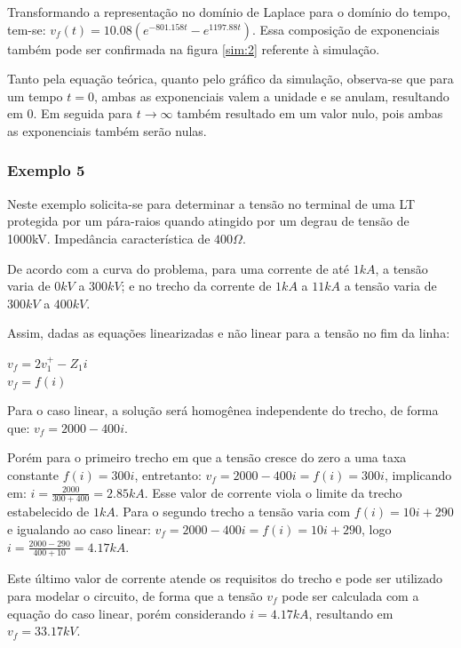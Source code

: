 Transformando a representação no domínio de Laplace para o domínio do tempo, tem-se: $v_f(t) = 10.08(e^{-801.158t}-e^{1197.88t})$. Essa composição de exponenciais também pode ser confirmada na figura \ref{sim:2} referente à simulação.

Tanto pela equação teórica, quanto pelo gráfico da simulação, observa-se que para um tempo $t=0$, ambas as exponenciais valem a unidade e se anulam, resultando em 0. Em seguida para $t\longrightarrow \infty$ também resultado em um valor nulo, pois ambas as exponenciais também serão nulas.


\subsubsection*{Exemplo 5}

Neste exemplo solicita-se para determinar a tensão no terminal de uma LT protegida por um pára-raios quando atingido por um degrau de tensão de 1000kV. Impedância característica de $400 \Omega$. 

De acordo com a curva do problema, para uma corrente de até $1kA$, a tensão varia de $0kV$ a $300kV$; e no trecho da corrente de $1kA$ a $11kA$ a tensão varia de $300kV$ a $400kV$. 

Assim, dadas as equações linearizadas e não linear para a tensão no fim da linha:

\begin{center}
    $v_f = 2v_1^{+}-Z_1i$ \\ \vspace{1pt}
    $v_f=f(i)$
\end{center}

Para o caso linear, a solução será homogênea independente do trecho, de forma que: $v_f = 2000 - 400i$. 

Porém para o primeiro trecho em que a tensão cresce do zero a uma taxa constante $f(i) = 300i$, entretanto: $v_f = 2000 - 400i = f(i) = 300i$, implicando em: $i = \frac{2000}{300+400} = 2.85kA$. Esse valor de corrente viola o limite da trecho estabelecido de $1kA$. Para o segundo trecho a tensão varia com $f(i) = 10i + 290$ e igualando ao caso linear: $v_f = 2000 - 400i = f(i) = 10i+290$, logo $i = \frac{2000-290}{400+10} = 4.17kA$. 

Este último valor de corrente atende os requisitos do trecho e pode ser utilizado para modelar o circuito, de forma que a tensão $v_f$ pode ser calculada com a equação do caso linear, porém considerando $i =4.17kA$, resultando em $v_f = 33.17kV$.


